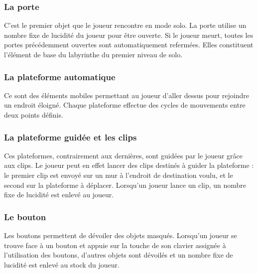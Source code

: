 \documentclass[a4paper , 12pt]{article}
\begin{document}
		\subsubsection{La porte}

	\quad

C’est le premier objet que le joueur rencontre en mode solo. La porte utilise un nombre fixe de lucidité du joueur pour être ouverte. Si le joueur meurt, toutes les portes précédemment ouvertes sont automatiquement refermées. Elles constituent l’élément de base du labyrinthe du premier niveau de solo.

\quad

		\subsubsection{La plateforme automatique}

	\quad

Ce sont des éléments mobiles permettant au joueur d’aller dessus pour rejoindre un endroit éloigné. Chaque plateforme effectue des cycles de mouvements entre deux points définis.

\quad

		\subsubsection{La plateforme guidée et les clips}

	\quad

Ces plateformes, contrairement aux dernières, sont guidées par le joueur grâce aux clips. Le joueur peut en effet lancer des clips destinés à guider la plateforme : le premier clip est envoyé sur un mur à l’endroit de destination voulu, et le second sur la plateforme à déplacer. Lorsqu’un joueur lance un clip, un nombre fixe de lucidité est enlevé au joueur.

	\quad

		\subsubsection{Le bouton}

	\quad

Les boutons permettent de dévoiler des objets masqués. Lorsqu’un joueur se trouve face à un bouton et appuie sur la touche de son clavier assignée à l’utilisation des boutons, d’autres objets sont dévoilés et un nombre fixe de lucidité est enlevé au stock du joueur.

	\quad
\end{document}
